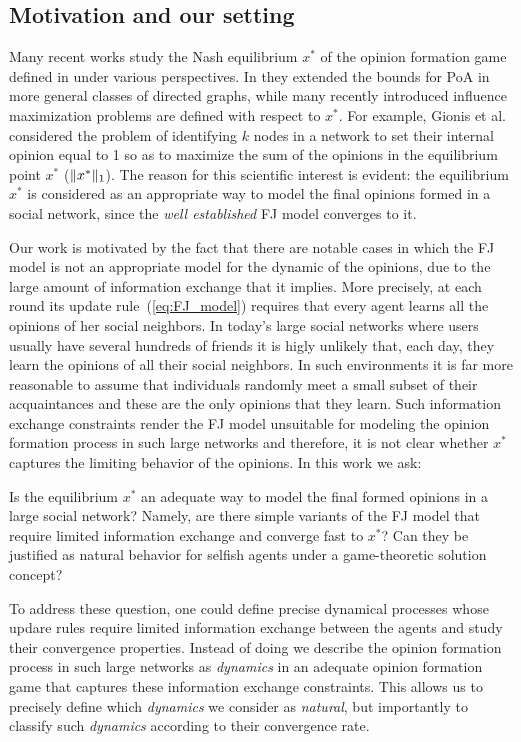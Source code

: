 \subsection{Motivation and our setting}

Many recent works study the Nash equilibrium $x^*$ of the opinion formation
game defined in \cite{BKO11} under various perspectives. In \cite{CCL16} they
extended the bounds for PoA in more general classes of directed graphs, while
many recently introduced influence maximization problems
\cite{GTT13,AKPT18,MMT17} are defined with respect to $x^*$.  For example,
Gionis et al. \cite{GTT13} considered the problem of identifying $k$ nodes in a
network to set their internal opinion equal to 1 so as to maximize the sum of
the opinions in the equilibrium point $x^*$ ($\norm{1}{x^*}$).  The reason for
this scientific interest is evident: the equilibrium $x^*$ is considered as an
appropriate way to model the final opinions formed in a social network, since
the \emph{well established} FJ model converges to it.

Our work is motivated by the fact that there are notable cases in which the FJ
model is not an appropriate model for the dynamic of the opinions, due to the
large amount of information exchange that it implies.  More precisely, at each
round its update rule~(\ref{eq:FJ_model}) requires that every agent learns all
the opinions of her social neighbors.  In today's large social networks where
users usually have several hundreds of friends it is higly unlikely that, each
day, they learn the opinions of all their social neighbors.  In such
environments it is far more reasonable to assume that individuals randomly meet
a small subset of their acquaintances and these are the only opinions that they
learn. Such information exchange constraints render the FJ model unsuitable for
modeling the opinion formation process in such large networks and therefore, it
is not clear whether $x^*$ captures the limiting behavior of the opinions. In
this work we ask:
%
\begin{question}\label{q:motivation1}
  Is the equilibrium $x^*$ an adequate way to model the final formed opinions
  in a large social network? Namely, are there simple variants of the FJ model
  that require limited information exchange and converge fast to $x^*$? Can
  they be justified as natural behavior for selfish agents under a
  game-theoretic solution concept?
\end{question}

To address these question, one could define precise dynamical processes
whose updare rules require limited information exchange between the agents 
and study their convergence properties. Instead of doing we describe the
opinion formation process in such large networks as \emph{dynamics} in 
an adequate opinion formation game that captures these information exchange 
constraints. This allows us to precisely define which \emph{dynamics}
we consider as \emph{natural}, but importantly to classify such \emph{dynamics}
according to their convergence rate. 


